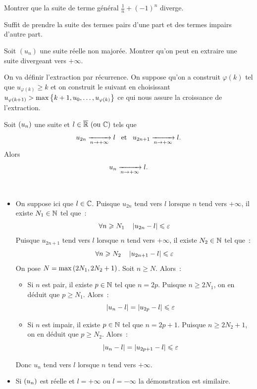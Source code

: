 \documentclass{magnolia}
\begin{document}
\begin{exos}
\exo Montrer que la suite de terme général $\frac{1}{n}+(-1)^n$ diverge.
\begin{sol}
Suffit de prendre la suite des termes pairs d'une part et des termes impairs d'autre part.
\end{sol}
\exo Soit $(u_n)$ une suite réelle non majorée. Montrer qu'on peut en
  extraire une suite divergeant vers $+\infty$.
  \begin{sol}
  On va définir l'extraction par récurrence. On suppose qu'on a construit $\varphi(k)$ tel que $u_{\varphi(k)}\geq k$ et on construit le suivant en choisissant $u_{\varphi(k+1)}> \max\left\{k+1,u_0,\ldots,u_{\varphi(k)}\right\}$ ce qui nous assure la croissance de l'extraction.
  \end{sol}
\end{exos}


 \begin{proposition}[utile=-3]
 Soit $\left(u_n\right)$ une suite et $l\in\text{$\overline{\mathbb{R}}$ (ou $\mathbb{C}$)}$  tels que
 \[u_{2n}\xrightarrow[n\rightarrow +\infty]{} l \quad\!\text{et}\quad\!
   u_{2n+1}\xrightarrow[n\rightarrow +\infty]{} l.\]
 Alors
 \[u_n \xrightarrow[n\rightarrow +\infty]{} l.\]
 \end{proposition}

 \begin{preuve}
 $\quad$
 \begin{itemize}
 \item On suppose ici que $l\in\mathbb{C}$. Puisque $u_{2n}$ tend vers $l$ lorsque $n$
   tend vers $+\infty$, il existe $N_1\in\mathbb{N}$ tel que~:
   \[\forall n\geqslant N_1 \quad \left|u_{2n}-l\right|\leqslant \varepsilon\]
   Puisque $u_{2n+1}$ tend vers $l$ lorsque $n$ tend vers $+\infty$, il existe
   $N_2\in\mathbb{N}$ tel que~:
   \[\forall n\geqslant N_2 \quad \left|u_{2n+1}-l\right|\leqslant \varepsilon\]
   On pose $N=\max\left(2N_1,2N_2+1\right)$. Soit $n\geq N$. Alors~:
   \begin{itemize}
   \item Si $n$ est pair, il existe $p\in\mathbb{N}$ tel que $n=2p$. Puisque
     $n\geq 2N_1$, on en déduit que $p\geq N_1$. Alors~:
     \[\left|u_n-l\right|=\left|u_{2p}-l\right| \leqslant \varepsilon\]
   \item Si $n$ est impair, il existe $p\in\mathbb{N}$ tel que $n=2p+1$. Puisque
     $n\geq 2N_2+1$, on en déduit que $p\geq N_2$. Alors~:
     \[\left|u_n-l\right|=\left|u_{2p+1}-l\right| \leqslant \varepsilon\]
   \end{itemize}
   Donc $u_n$ tend vers $l$ lorsque $n$ tend vers $+\infty$.
 \item Si $\left(u_n\right)$ est réelle et $l=+\infty$ ou $l=-\infty$ la démonstration
   est similaire.
 \end{itemize}
 \end{preuve}
\end{document}
